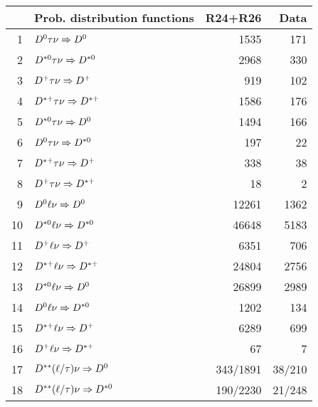 \documentclass[6pt]{article}
\begin{document}
 

\begin{tabular}{r l r r }\\ \hline\hline
     & \multicolumn{1}{c}{\bf Prob. distribution functions}  & R24+R26 & Data \\ \hline
1    & $D^0\tau\nu\Rightarrow D^0$                             &  1535	     &   171	       \\
2    & $D^{*0}\tau\nu\Rightarrow D^{*0}$                     &  2968	     &   330	       \\
3    & $D^+\tau\nu\Rightarrow D^+$                             &  919	     &   102	       \\
4    & $D^{*+}\tau\nu\Rightarrow D^{*+}$                     &  1586	     &   176	       \\
5    & $D^{*0}\tau\nu\Rightarrow D^0$                         &  1494	     &   166	       \\
6    & $D^0\tau\nu\Rightarrow D^{*0}$                         &  197	     &   22	       \\
7    & $D^{*+}\tau\nu\Rightarrow D^+$                         &  338	     &   38	       \\
8    & $D^+\tau\nu\Rightarrow D^{*+}$                         &  18	     &   2	       \\
9    & $D^0\ell\nu\Rightarrow D^0$                             &  12261	     &   1362	       \\
10   & $D^{*0}\ell\nu\Rightarrow D^{*0}$                     &  46648	     &   5183	       \\
11   & $D^+\ell\nu\Rightarrow D^+$                             &  6351	     &   706	       \\
12   & $D^{*+}\ell\nu\Rightarrow D^{*+}$                     &  24804	     &   2756	       \\
13   & $D^{*0}\ell\nu\Rightarrow D^0$                         &  26899	     &   2989	       \\
14   & $D^0\ell\nu\Rightarrow D^{*0}$                         &  1202	     &   134	       \\
15   & $D^{*+}\ell\nu\Rightarrow D^+$                         &  6289	     &   699	       \\
16   & $D^+\ell\nu\Rightarrow D^{*+}$                         &  67	     &   7	       \\
17   & $D^{**}(\ell/\tau)\nu\Rightarrow D^0$                   &  343/1891    &   38/210	       \\
18   & $D^{**}(\ell/\tau)\nu\Rightarrow D^{*0}$               &  190/2230    &   21/248	       \\

\end{tabular}
\end{document}
